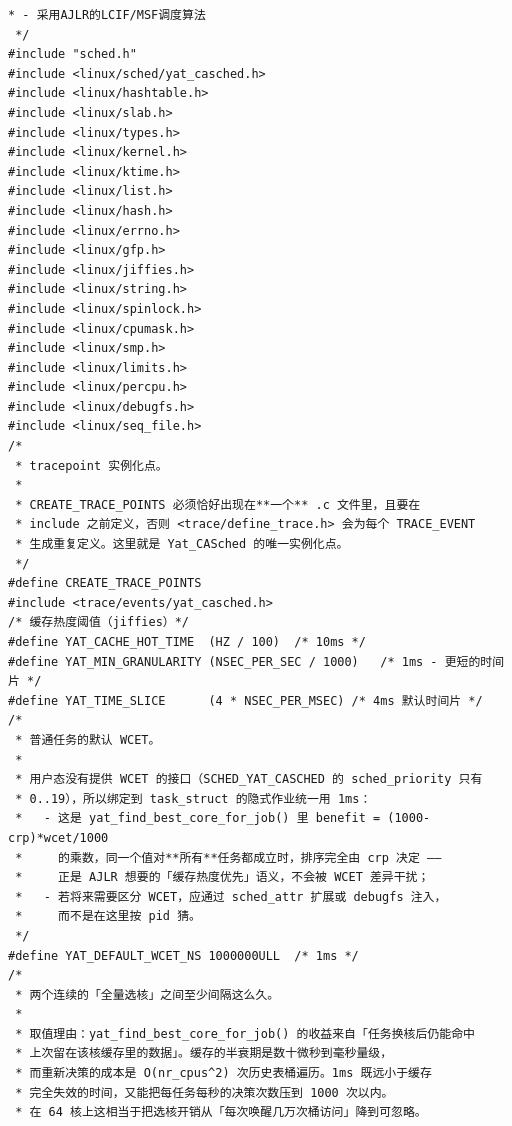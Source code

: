 \documentclass[10pt,a4paper]{article}
\newenvironment{yatpage}{\vspace*{0pt}}{\par}
\begin{document}
\begin{yatpage}
\begin{Verbatim}[fontsize=\fontsize{8.2}{9.8}\selectfont]
 * - 采用AJLR的LCIF/MSF调度算法
 */
#include "sched.h"
#include <linux/sched/yat_casched.h>
#include <linux/hashtable.h>
#include <linux/slab.h>
#include <linux/types.h>
#include <linux/kernel.h>
#include <linux/ktime.h>
#include <linux/list.h>
#include <linux/hash.h>
#include <linux/errno.h>
#include <linux/gfp.h>
#include <linux/jiffies.h>
#include <linux/string.h>
#include <linux/spinlock.h>
#include <linux/cpumask.h>
#include <linux/smp.h>
#include <linux/limits.h>
#include <linux/percpu.h>
#include <linux/debugfs.h>
#include <linux/seq_file.h>
/*
 * tracepoint 实例化点。
 *
 * CREATE_TRACE_POINTS 必须恰好出现在**一个** .c 文件里，且要在
 * include 之前定义，否则 <trace/define_trace.h> 会为每个 TRACE_EVENT
 * 生成重复定义。这里就是 Yat_CASched 的唯一实例化点。
 */
#define CREATE_TRACE_POINTS
#include <trace/events/yat_casched.h>
/* 缓存热度阈值（jiffies）*/
#define YAT_CACHE_HOT_TIME	(HZ / 100)	/* 10ms */
#define YAT_MIN_GRANULARITY	(NSEC_PER_SEC / 1000)	/* 1ms - 更短的时间片 */
#define YAT_TIME_SLICE		(4 * NSEC_PER_MSEC)	/* 4ms 默认时间片 */
/*
 * 普通任务的默认 WCET。
 *
 * 用户态没有提供 WCET 的接口（SCHED_YAT_CASCHED 的 sched_priority 只有
 * 0..19），所以绑定到 task_struct 的隐式作业统一用 1ms：
 *   - 这是 yat_find_best_core_for_job() 里 benefit = (1000-crp)*wcet/1000
 *     的乘数，同一个值对**所有**任务都成立时，排序完全由 crp 决定 ——
 *     正是 AJLR 想要的「缓存热度优先」语义，不会被 WCET 差异干扰；
 *   - 若将来需要区分 WCET，应通过 sched_attr 扩展或 debugfs 注入，
 *     而不是在这里按 pid 猜。
 */
#define YAT_DEFAULT_WCET_NS	1000000ULL	/* 1ms */
/*
 * 两个连续的「全量选核」之间至少间隔这么久。
 *
 * 取值理由：yat_find_best_core_for_job() 的收益来自「任务换核后仍能命中
 * 上次留在该核缓存里的数据」。缓存的半衰期是数十微秒到毫秒量级，
 * 而重新决策的成本是 O(nr_cpus^2) 次历史表桶遍历。1ms 既远小于缓存
 * 完全失效的时间，又能把每任务每秒的决策次数压到 1000 次以内。
 * 在 64 核上这相当于把选核开销从「每次唤醒几万次桶访问」降到可忽略。
\end{Verbatim}
\end{yatpage}
\newpage
\end{document}
